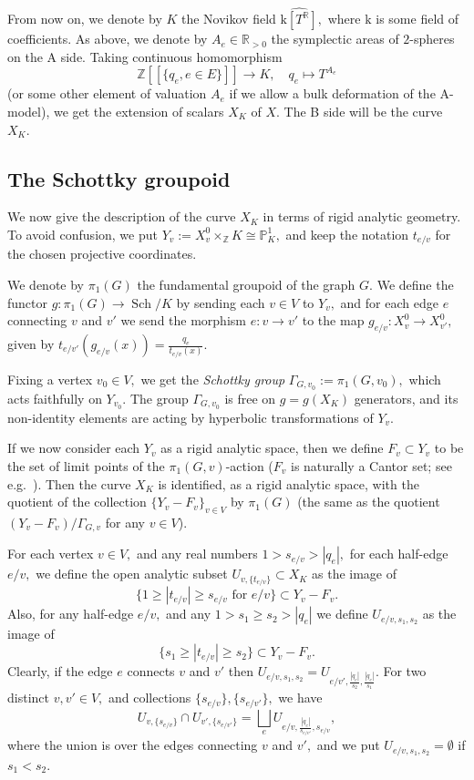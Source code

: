 \documentclass[11pt,leqno]{amsart}
\numberwithin{equation}{section}
\def\R{\mathbb{R}}
\def\Z{\mathbb{Z}}
\def\PP{{\mathbb P}}
\newcommand{\hhat}{\widehat}
\newcommand{\Sch}{\operatorname{Sch}}
\newcommand{\mk}{\mathrm k}
\begin{document}
From now on, we denote by $K$ the Novikov field $\hhat{\mk[T^{\R}]},$ where $\mk$ is some field of coefficients. As above, we denote by $A_e\in\R_{>0}$ the symplectic areas of $2$-spheres on the A side. Taking continuous homomorphism $$\Z[[\{q_e, e\in E\}]]\to K,\quad q_e\mapsto T^{A_e}$$ 
(or some other element of valuation $A_e$ if we allow a bulk deformation of the A-model),
we get the extension of scalars $X_K$ of $X.$ The B side will be the curve $X_K.$

\subsection{The Schottky groupoid}

We now give the description of the curve $X_K$ in terms of rigid analytic geometry. To avoid confusion, we put $Y_v:=X^0_v\times_{\Z} K\cong\PP^1_K,$ and keep the notation $t_{e/v}$ for the chosen projective coordinates.

We denote by $\pi_1(G)$ the fundamental groupoid of the graph $G.$ We define the functor $g:\pi_1(G)\to \Sch/K$ by sending each $v\in V$ to $Y_v,$ and for each edge $e$ connecting $v$ and $v'$ we send the morphism $e:v\to v'$ to the map $g_{e/v}:X^0_v\to X^0_{v'},$ given by $t_{e/v'}(g_{e/v}(x))=\frac{q_e}{t_{e/v}(x)}.$

Fixing a vertex $v_0\in V,$ we get the {\it Schottky group} $\Gamma_{G,v_0}:=\pi_1(G,v_0),$ which acts faithfully on $Y_{v_0}.$ The group $\Gamma_{G,v_0}$ is free on $g=g(X_K)$ generators, and its non-identity elements are acting by hyperbolic transformations of $Y_v.$ 

If we now consider each $Y_v$ as a rigid analytic space, then we define $F_v\subset Y_v$ to be the set of limit points of the $\pi_1(G,v)$-action ($F_v$ is naturally a Cantor
set; see e.g.\ \cite[Chapter I]{Gerritzen-VdPut}).
Then the curve $X_K$ is identified, as a rigid analytic space, with the quotient of the collection $\{Y_v-F_v\}_{v\in V}$ by $\pi_1(G)$ (the same as the quotient $(Y_v-F_v)/\Gamma_{G,v}$ for any $v\in V$).   




For each vertex $v\in V,$ and any real numbers $1>s_{e/v}>|q_e|,$ for each half-edge $e/v,$ we define the open analytic subset $U_{v,\{t_{e/v}\}}\subset X_K$ as the image of $$\{1\geq |t_{e/v}|\geq s_{e/v}\text{ for }e/v\}\subset Y_v-F_v.$$ Also, for any half-edge $e/v,$ and any $1>s_1\geq s_2>|q_e|$ we define $U_{e/v,s_1,s_2}$ as the image of $$\{s_1\geq |t_{e/v}|\geq s_2\}\subset Y_v-F_v.$$ Clearly, if the edge $e$ connects $v$ and $v'$ then $U_{e/v,s_1,s_2}=U_{e/v',\frac{|q_e|}{s_2},\frac{|q_e|}{s_1}}.$ For two distinct $v,v'\in V,$ and collections $\{s_{e/v}\},\{s_{e/v'}\},$ we have
$$U_{v,\{s_{e/v}\}}\cap U_{v',\{s_{e/v'}\}}=\bigsqcup_{e}U_{e/v,\frac{|q_e|}{s_{e/v'}},s_{e/v}},$$
where the union is over the edges connecting $v$ and $v',$ and we put $U_{e/v,s_1,s_2}=\emptyset$ if $s_1<s_2.$
\end{document}
